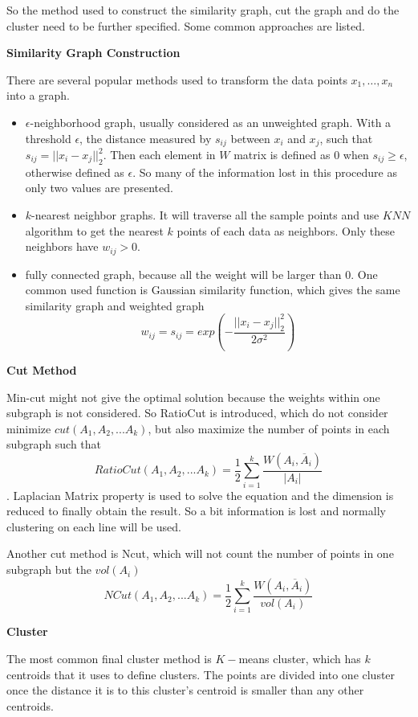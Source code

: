 \documentclass[catalog.tex]{subfiles}
\begin{document}
So the method used to construct the similarity graph, cut the graph and do the cluster need to be further specified. Some common approaches are listed.

\textbf{Similarity Graph Construction} \cite{ts}

There are several popular methods used to transform the data points $x_1, \dots ,x_n$ into a graph. 
\begin{itemize}
\item $\epsilon$-neighborhood graph, usually considered as an unweighted graph. With a threshold $\epsilon$, the distance measured by $s_{ij}$ between $x_i$ and $x_j$, such that $s_{ij} = ||x_i-x_j||_2^2$. Then each element in $W$ matrix is defined as $0$ when $s_{ij}\geq \epsilon$, otherwise defined as $\epsilon$. So many of the information lost in this procedure as only two values are presented. 
\item $k$-nearest neighbor graphs. It will traverse all the sample points and use $KNN$ algorithm to get the nearest $k$ points of each data as neighbors. Only these neighbors have $w_{ij}>0$.
\item fully connected graph, because all the weight will be larger than 0. One common used function is Gaussian similarity function, which gives the same similarity graph and weighted graph
$$w_{ij}=s_{ij}=exp(-\frac{||x_i-x_j||_2^2}{2\sigma^2})$$
\end{itemize}

\textbf{Cut Method}

Min-cut might not give the optimal solution because the weights within one subgraph is not considered. So RatioCut\cite{slides} is introduced, which do not consider minimize $cut(A_1,A_2,...A_k)$, but also maximize the number of points in each subgraph such that $$RatioCut(A_1,A_2,...A_k) = \frac{1}{2}\sum\limits_{i=1}^{k}\frac{W(A_i, \overline{A}_i)}{|A_i|}$$.  Laplacian Matrix property is used to solve the equation and the dimension is reduced to finally obtain the result. So a bit information is lost and normally clustering on each line will be used. 

Another cut method is Ncut, which will not count the number of points in one subgraph but the $vol(A_i)$
$$NCut(A_1,A_2,...A_k) = \frac{1}{2}\sum\limits_{i=1}^{k}\frac{W(A_i, \overline{A}_i)}{vol(A_i)}$$


\textbf{Cluster}

The most common final cluster method is $K-$means cluster\cite{stslides}, which has $k$ centroids that it uses to define clusters. The points are divided into one cluster once the distance it is to this cluster's centroid is smaller than any other centroids.  
\end{document}
